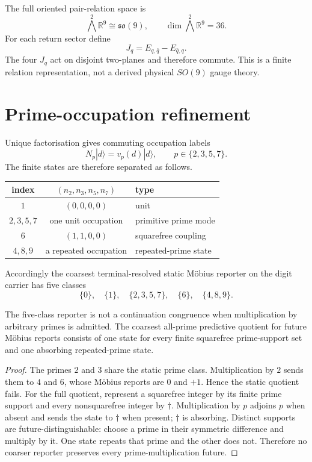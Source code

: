 \documentclass[11pt,a4paper]{article}
\begin{document}
The full oriented pair-relation space is
\begin{equation}
\bigwedge^2\mathbb R^9\cong\mathfrak{so}(9),\qquad \dim\bigwedge^2\mathbb R^9=36.
\end{equation}
For each return sector define
\begin{equation}
J_q=E_{q,\bar q}-E_{\bar q,q}.
\end{equation}
The four $J_q$ act on disjoint two-planes and therefore commute. This is a finite relation representation, not a derived physical $SO(9)$ gauge theory.

\section{Prime-occupation refinement}
Unique factorisation gives commuting occupation labels
\begin{equation}
N_p|d\rangle=v_p(d)|d\rangle,\qquad p\in\{2,3,5,7\}.
\end{equation}
The finite states are therefore separated as follows.
\begin{center}
\begin{tabular}{ccl}
\toprule
index&$(n_2,n_3,n_5,n_7)$&type\\\midrule
$1$&$(0,0,0,0)$&unit\\
$2,3,5,7$&one unit occupation&primitive prime mode\\
$6$&$(1,1,0,0)$&squarefree coupling\\
$4,8,9$&a repeated occupation&repeated-prime state\\
\bottomrule
\end{tabular}
\end{center}
Accordingly the coarsest terminal-resolved static M\"obius reporter on the digit carrier has five classes
\begin{equation}
\{0\},\quad\{1\},\quad\{2,3,5,7\},\quad\{6\},\quad\{4,8,9\}.
\end{equation}

\begin{theorem}
The five-class reporter is not a continuation congruence when multiplication by arbitrary primes is admitted. The coarsest all-prime predictive quotient for future M\"obius reports consists of one state for every finite squarefree prime-support set and one absorbing repeated-prime state.
\end{theorem}
\begin{proof}
The primes $2$ and $3$ share the static prime class. Multiplication by $2$ sends them to $4$ and $6$, whose M\"obius reports are $0$ and $+1$. Hence the static quotient fails. For the full quotient, represent a squarefree integer by its finite prime support and every nonsquarefree integer by $\dagger$. Multiplication by $p$ adjoins $p$ when absent and sends the state to $\dagger$ when present; $\dagger$ is absorbing. Distinct supports are future-distinguishable: choose a prime in their symmetric difference and multiply by it. One state repeats that prime and the other does not. Therefore no coarser reporter preserves every prime-multiplication future.
\end{proof}
\end{document}
